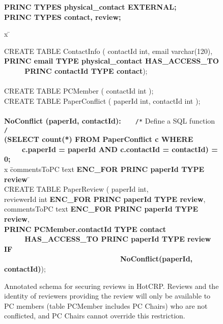 \begin{figure}
\renewcommand{\FrameSep}{0.05in}
\begin{framed}
\footnotesize

{\bf PRINC TYPES physical\_contact EXTERNAL;} \\
{\bf PRINC TYPES contact, review;}

\begin{tabbing}

x \= \kill


CREATE TABLE ContactInfo ( contactId int, email varchar(120), \\
\> {\bf PRINC email TYPE physical\_contact HAS\_ACCESS\_TO } \\
\> {\bf ~ ~ ~ PRINC contactId TYPE contact});\\

\\

CREATE TABLE PCMember ( contactId int ); \\

CREATE TABLE PaperConflict ( paperId int, contactId int );\\
\\

{\bf NoConflict (paperId, contactId):} ~ ~ {\tt /*} Define a SQL function {\tt */} \\
\> {\bf (SELECT count(*) FROM PaperConflict c  WHERE }\\
\> {~ ~ ~ \bf c.paperId = paperId AND c.contactId = contactId) = 0;} \\

x \= commentsToPC \= text \= {\bf ENC\_FOR PRINC paperId TYPE review} \= \kill
\\
CREATE TABLE PaperReview ( paperId int, \\
\> reviewerId \> int \> {\bf ENC\_FOR PRINC paperId TYPE review}, \\
\> commentsToPC \>text \> {\bf ENC\_FOR PRINC paperId TYPE review},\\


\> {\bf PRINC PCMember.contactId TYPE contact }\\
\> {\bf ~ ~ ~ HAS\_ACCESS\_TO PRINC paperId TYPE review IF } \\
\> {\bf ~ ~  ~ ~ ~ ~ ~ ~ ~ ~ ~ ~ ~ ~ ~ ~ ~ NoConflict(paperId, contactId)});

\end{tabbing}
\vspace{-0.15in}
\end{framed}
\caption{Annotated schema for securing reviews in HotCRP\@. Reviews and
the identity of reviewers providing the review will only be available to
PC members (table PCMember includes PC Chairs) who are not conflicted,
and PC Chairs cannot override this restriction.}

\label{fig:hotcrp}
\end{figure}



